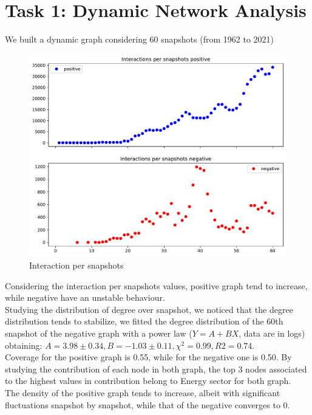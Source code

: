 \documentclass[sigchi]{acmart}
\begin{document}
\section{Task 1: Dynamic Network Analysis}
We built a dynamic graph considering 60 snapshots (from 1962 to 2021)
\begin{figure}[H]
	\centering
	\includegraphics[width= \linewidth]{plot/inter_snap.pdf}
	\caption{Interaction per snapshots}
\end{figure}
Considering the interaction per snapshots values, positive graph tend to increase, while negative have an unstable behaviour.\\
Studying the distribution of degree over snapshot, we noticed that the degree distribution tends to stabilize, we fitted the degree distribution of the 60th snapshot of the negative graph with a power law ($Y = A +BX$, data are in logs) obtaining: $A = 3.98 \pm 0.34, B = -1.03 \pm 0.11, \chi^2 = 0.99, R2 = 0.74$. \\
Coverage for the positive graph is 0.55, while for the negative one is 0.50. By studying the contribution of each node in both graph, the top 3 nodes associated to the highest values in contribution belong to Energy sector for both graph.\\
The density of the positive graph tends to increase, albeit with significant fluctuations snapshot by snapshot, while that of the negative converges to 0.  
\end{document}
